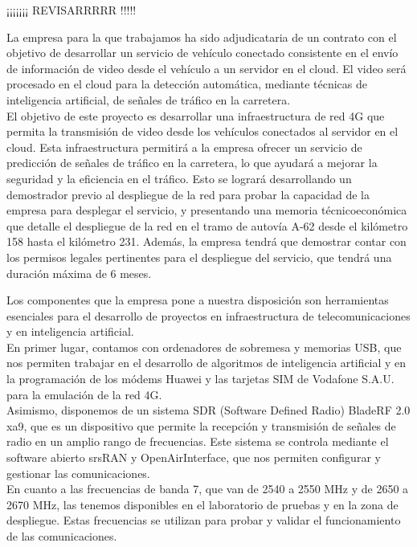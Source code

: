 ¡¡¡¡¡¡¡ REVISARRRRR !!!!!

La empresa para la que trabajamos ha sido adjudicataria de un contrato con el objetivo de desarrollar un servicio de vehículo conectado consistente en el envío de información de video desde el vehículo a un servidor en el cloud. El video será procesado en el cloud para la detección automática, mediante técnicas de inteligencia artificial, de señales de tráfico en la carretera.\\

El objetivo de este proyecto es desarrollar una infraestructura de red 4G que permita la transmisión de video desde los vehículos conectados al servidor en el cloud. Esta infraestructura permitirá a la empresa ofrecer un servicio de predicción de señales de tráfico en la carretera, lo que ayudará a mejorar la seguridad y la eficiencia en el tráfico. Esto se logrará desarrollando un demostrador previo al despliegue de la red para probar la capacidad de la empresa para desplegar el servicio, y presentando una memoria técnicoeconómica que detalle el despliegue de la red en el tramo de autovía A-62 desde el kilómetro 158 hasta el kilómetro 231. Además, la empresa tendrá que demostrar contar con los permisos legales pertinentes para el despliegue del servicio, que tendrá una duración máxima de 6 meses.

Los componentes que la empresa pone a nuestra disposición son herramientas esenciales para el desarrollo de proyectos en infraestructura de telecomunicaciones y en inteligencia artificial.\\

En primer lugar, contamos con ordenadores de sobremesa y memorias USB, que nos permiten trabajar en el desarrollo de algoritmos de inteligencia artificial y en la programación de los módems Huawei y las tarjetas SIM de Vodafone S.A.U. para la emulación de la red 4G.\\

Asimismo, disponemos de un sistema SDR (Software Defined Radio) BladeRF 2.0 xa9, que es un dispositivo que permite la recepción y transmisión de señales de radio en un amplio rango de frecuencias. Este sistema se controla mediante el software abierto srsRAN y OpenAirInterface, que nos permiten configurar y gestionar las comunicaciones.\\

En cuanto a las frecuencias de banda 7, que van de 2540 a 2550 MHz y de 2650 a 2670 MHz, las tenemos disponibles en el laboratorio de pruebas y en la zona de despliegue. Estas frecuencias se utilizan para probar y validar el funcionamiento de las comunicaciones.\\


